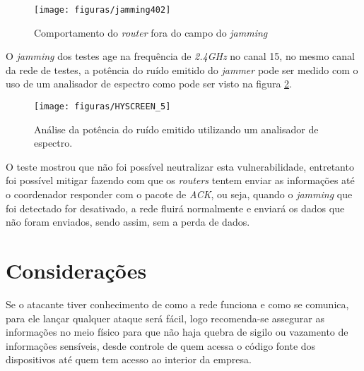 \begin{figure}[H]
    \centering
    \caption{Comportamento do \emph{router} fora do campo do \emph{jamming}}
    \texttt{[image: figuras/jamming402]}
    \label{fig:4jammingrouter}
\end{figure}

\par O \emph{jamming} dos testes age na frequ\^encia de \emph{2.4GHz} no canal 15, no mesmo canal da rede de testes, a pot\^encia do ru\'ido emitido do \emph{jammer} pode ser medido com o uso de um analisador de espectro como pode ser visto na figura \ref{fig:4jammingespectro}.

\begin{figure}[H]
    \centering
    \caption{An\'alise da pot\^encia do ru\'ido emitido utilizando um analisador de espectro.}
    \texttt{[image: figuras/HYSCREEN\_5]}
    \label{fig:4jammingespectro}
\end{figure}

\par O teste mostrou que n\~ao foi poss\'ivel neutralizar esta vulnerabilidade, entretanto foi poss\'ivel mitigar fazendo com que os \emph{routers} tentem enviar as informa\c{c}\~oes at\'e o coordenador responder com o pacote de \emph{ACK}, ou seja, quando o \emph{jamming} que foi detectado for desativado, a rede fluir\'a normalmente e enviar\'a os dados que n\~ao foram enviados, sendo assim, sem a perda de dados.

\section{Considera\c{c}\~oes}
\par Se o atacante tiver conhecimento de como a rede funciona e como se comunica, para ele lan\c{c}ar qualquer ataque ser\'a f\'acil, logo recomenda-se assegurar as informa\c{c}\~oes no meio f\'isico para que n\~ao haja quebra de sigilo ou vazamento de informa\c{c}\~oes sens\'iveis, desde controle de quem acessa o c\'odigo fonte dos dispositivos at\'e quem tem acesso ao interior da empresa.